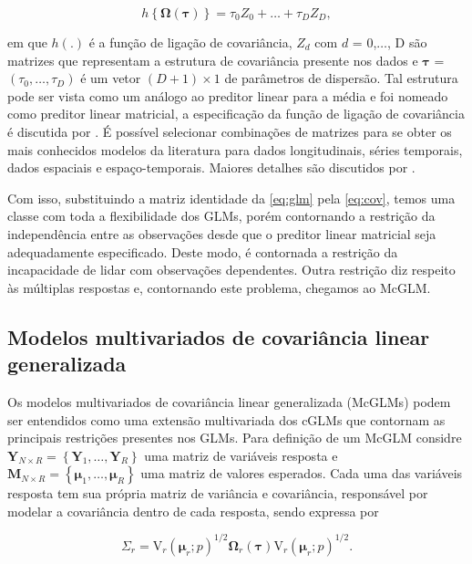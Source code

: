 \begin{equation}
\label{eq:cov}
h\left \{ \boldsymbol{\Omega}(\boldsymbol{\tau}) \right \} = \tau_0Z_0 + \ldots + \tau_DZ_D,
\end{equation}

\noindent em que $h(.)$ é a função de ligação de covariância, $Z_d$ com $d$ = 0,$\ldots$, D são matrizes que representam a estrutura de covariância presente nos dados e $\boldsymbol{\tau}$ = $(\tau_0, \ldots, \tau_D)$ é um vetor $(D + 1) \times 1$ de parâmetros de dispersão. Tal estrutura pode ser vista como um análogo ao preditor linear para a média e foi nomeado como preditor linear matricial, a especificação da função de ligação de covariância é discutida por \citet{Pinheiro96}. É possível selecionar combinações de matrizes para se obter os mais conhecidos modelos da literatura para dados longitudinais, séries temporais, dados espaciais e espaço-temporais. Maiores detalhes são discutidos por \citet{Demidenko13}.

Com isso, substituindo a matriz identidade da \autoref{eq:glm} pela \autoref{eq:cov}, temos uma classe com toda a flexibilidade dos GLMs, porém contornando a restrição da independência entre as observações desde que o preditor linear matricial seja adequadamente especificado. Deste modo, é contornada a restrição da incapacidade de lidar com observações dependentes. Outra restrição diz respeito às múltiplas respostas e, contornando este problema, chegamos ao McGLM.

\subsection{Modelos multivariados de covariância linear generalizada}

Os modelos multivariados de covariância linear generalizada (McGLMs) podem ser entendidos como uma extensão multivariada dos cGLMs que contornam as principais restrições presentes nos GLMs. Para definição de um McGLM considre $\boldsymbol{Y}_{N \times R} = \left \{ \boldsymbol{Y}_1, \dots, \boldsymbol{Y}_R \right \}$ uma  matriz de variáveis resposta e $\boldsymbol{M}_{N \times R} = \left \{ \boldsymbol{\mu}_1, \dots, \boldsymbol{\mu}_R \right \}$ uma matriz de valores esperados. Cada uma das variáveis resposta tem sua própria matriz de variância e covariância, responsável por modelar a covariância dentro de cada resposta, sendo expressa por

\begin{equation}
\Sigma_r =
\mathrm{V}_r\left(\boldsymbol{\mu}_r; p\right)^{1/2}\boldsymbol{\Omega}_r\left(\boldsymbol{\tau}\right)\mathrm{V}_r\left(\boldsymbol{\mu}_r; p\right)^{1/2}.
\end{equation}

